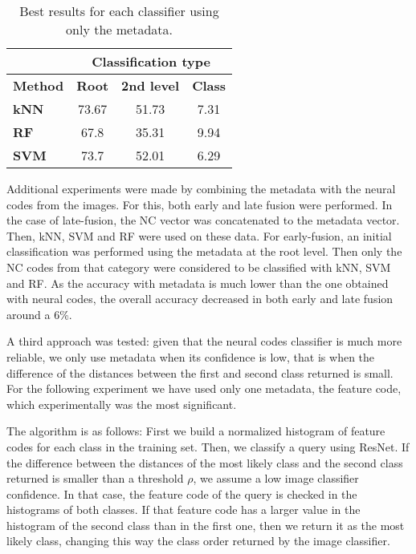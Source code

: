 \documentclass[final, twocolumn]{elsarticle}
\begin{document}
\begin{table}
\centering
\footnotesize
\begin{tabular}{lccc}
\hline
                & \multicolumn{3}{c}{\textbf{Classification type}}    \\ \hline
\textbf{Method} & \textbf{Root} & \textbf{2nd level} & \textbf{Class} \\ \hline
\textbf{kNN}    & 73.67         & 51.73              & 7.31           \\
\textbf{RF}     & 67.8          & 35.31              & 9.94           \\
\textbf{SVM}    & 73.7          & 52.01              & 6.29           \\ \hline
\end{tabular}
\caption{Best results for each classifier using only the metadata.}
\label{tab:metadata-results}
\end{table}


Additional experiments were made by combining the  metadata with the neural codes from the images. For this, both early and late fusion were performed. In the case of late-fusion, the NC vector was concatenated to the metadata vector. Then, kNN, SVM and RF were used on these data. For early-fusion, an initial classification was performed using the metadata at the root level. Then only the NC codes from that category were considered to be classified  with kNN, SVM and RF. As the accuracy with metadata is much lower than the one obtained with neural codes, the overall accuracy decreased in both early and late fusion around a 6\%.

A third approach was tested: given that the neural codes classifier is much more reliable, we only use metadata when its confidence is low, that is when the difference of the distances between the first and second class returned is small. For the following experiment we have used only one metadata, the feature code, which experimentally was the most significant.

The algorithm is as follows: First we build a normalized histogram of feature codes for each class in the training set. Then, we classify a query using ResNet. If the difference between the distances of the most likely class and the second class returned is smaller than a threshold $\rho$, we assume a low image classifier confidence. In that case, the feature code of the query is checked in the histograms of both classes. If that feature code has a larger value in the histogram of the second class than in the first one, then we return it as the most likely class, changing this way the class order returned by the image classifier.
\end{document}
